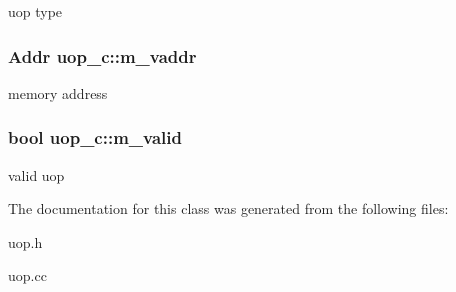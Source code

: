 \label{classuop__c_aa8674c436855849f9f2d0c8ab0267e3b}
uop type \hypertarget{classuop__c_a8211cb652547c417466a9aa8fa603e6b}{
\subsubsection[{m\_\-vaddr}]{\setlength{\rightskip}{0pt plus 5cm}Addr {\bf uop\_\-c::m\_\-vaddr}}}
\label{classuop__c_a8211cb652547c417466a9aa8fa603e6b}
memory address \hypertarget{classuop__c_aa18f9a89a6d89e20ba459a3d0dc4f90e}{
\subsubsection[{m\_\-valid}]{\setlength{\rightskip}{0pt plus 5cm}bool {\bf uop\_\-c::m\_\-valid}}}
\label{classuop__c_aa18f9a89a6d89e20ba459a3d0dc4f90e}
valid uop 

The documentation for this class was generated from the following files:\begin{DoxyCompactItemize}
\item 
uop.h\item 
uop.cc\end{DoxyCompactItemize}
